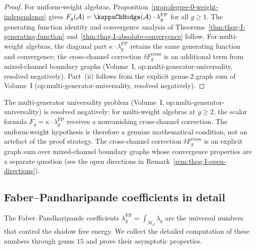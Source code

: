 \begin{proof}
For uniform-weight algebras,
Proposition~\ref{prop:degree-0-weight-independence} gives
$F_g(\cA) = \kappaChHodge(\cA) \cdot \lambda_g^{\mathrm{FP}}$ for all
$g \geq 1$. The generating function identity and convergence
analysis of Theorems~\ref{thm:thqg-I-generating-function}
and~\ref{thm:thqg-I-absolute-convergence} follow.
For multi-weight algebras, the diagonal part
$\kappa \cdot \lambda_g^{\mathrm{FP}}$ retains the same
generating function and convergence; the cross-channel
correction $\delta F_g^{\mathrm{cross}}$ is an additional term
from mixed-channel boundary graphs
\textup{(}Volume~I, op:multi-generator-universality,
resolved negatively\textup{)}.
Part~(ii) follows from the explicit genus-$2$ graph sum
of Volume~I \textup{(}op:multi-generator-universality,
resolved negatively\textup{)}.
\end{proof}

\begin{remark}
\label{rem:multi-weight-scope}
The multi-generator universality problem
\textup{(}Volume~I, op:multi-generator-universality\textup{)}
is resolved negatively: for multi-weight algebras at
$g \geq 2$, the scalar formula $F_g = \kappa \cdot
\lambda_g^{\mathrm{FP}}$ receives a nonvanishing cross-channel
correction. The uniform-weight hypothesis is therefore a
genuine mathematical condition, not an artefact of the proof
strategy. The cross-channel correction
$\delta F_g^{\mathrm{cross}}$ is an explicit graph sum over
mixed-channel boundary graphs whose convergence properties are a
separate question \textup{(}see the open directions in
Remark~\textup{\ref{rem:thqg-I-open-directions})}.
\end{remark}



\subsection{Faber--Pandharipande coefficients in detail}

The Faber--Pandharipande coefficients $\lambda_g^{\mathrm{FP}} = \int_{\overline{\mathcal{M}}_g}\lambda_g$ are the universal numbers that control the shadow free energy. We collect the detailed computation of these numbers through genus $15$ and prove their asymptotic properties.

